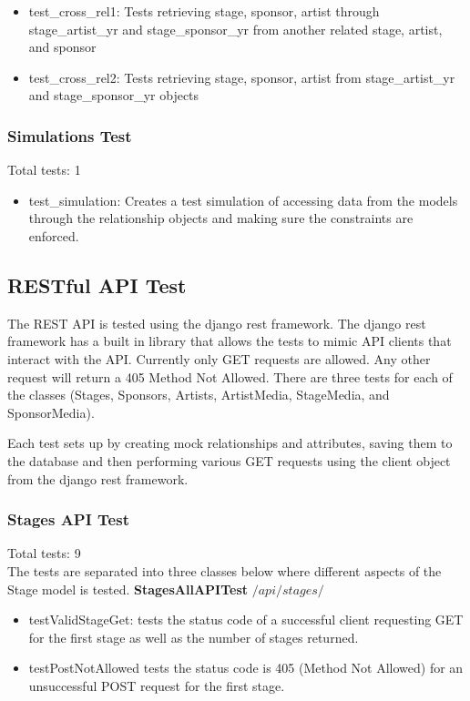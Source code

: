 \documentclass[12pt,english]{scrartcl}
\begin{document}
\begin{itemize}
 \item test\_cross\_rel1: Tests retrieving stage, sponsor, artist through stage\_artist\_yr and stage\_sponsor\_yr from another related stage, artist, and sponsor
 \item test\_cross\_rel2: Tests retrieving stage, sponsor, artist from stage\_artist\_yr and stage\_sponsor\_yr objects
\end{itemize}


\subsubsection{Simulations Test}
Total tests: 1 \\

\begin{itemize}
 \item test\_simulation: Creates a test simulation of accessing data from the models through the relationship objects and 
 making sure the constraints are enforced.
\end{itemize}

\subsection{RESTful API Test} 

The REST API is tested using the django rest framework. The django rest framework has a built in library that allows the tests to mimic API clients that interact with the API.
Currently only GET requests are allowed. Any other request will return a 405 Method Not Allowed. There are three tests for each of the 
classes (Stages, Sponsors, Artists, ArtistMedia, StageMedia, and SponsorMedia). 

Each test sets up by creating mock relationships and attributes,
saving them to the database and then performing various GET requests using the client object from the django rest framework.

\subsubsection{Stages API Test} 
Total tests: 9 \\
The tests are separated into three classes below where different aspects of the Stage model is tested.
{\bf StagesAllAPITest}
$/api/stages/$
\begin{itemize}
 \item testValidStageGet: tests the status code of a successful client requesting GET for the first stage as well as the number of stages returned.
 \item testPostNotAllowed tests the status code is 405 (Method Not Allowed) for an unsuccessful POST request for the first stage.
\end{itemize}
\end{document}
